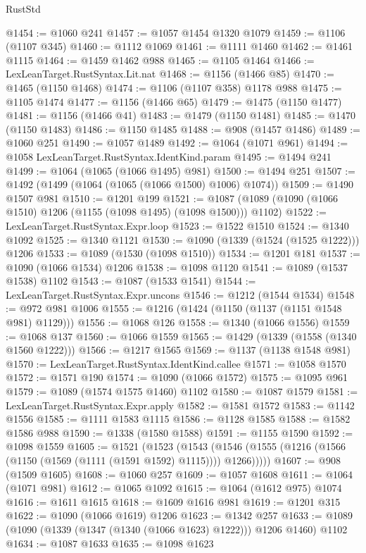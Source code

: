 \begin{lexlean}{RustStd}
\begin{coremodule}
@1454 := @1060 @241
@1457 := @1057 @1454 @1320 @1079
@1459 := @1106 (@1107 @345)
@1460 := @1112 @1069
@1461 := @1111 @1460
@1462 := @1461 @1115
@1464 := @1459 @1462 @988
@1465 := @1105 @1464
@1466 := LexLeanTarget.RustSyntax.Lit.nat
@1468 := @1156 (@1466 @85)
@1470 := @1465 (@1150 @1468)
@1474 := @1106 (@1107 @358) @1178 @988
@1475 := @1105 @1474
@1477 := @1156 (@1466 @65)
@1479 := @1475 (@1150 @1477)
@1481 := @1156 (@1466 @41)
@1483 := @1479 (@1150 @1481)
@1485 := @1470 (@1150 @1483)
@1486 := @1150 @1485
@1488 := @908 (@1457 @1486)
@1489 := @1060 @251
@1490 := @1057 @1489
@1492 := @1064 (@1071 @961)
@1494 := @1058 LexLeanTarget.RustSyntax.IdentKind.param
@1495 := @1494 @241
@1499 := @1064 (@1065 (@1066 @1495) @981)
@1500 := @1494 @251
@1507 := @1492 (@1499 (@1064 (@1065 (@1066 @1500) @1006) @1074))
@1509 := @1490 @1507 @981
@1510 := @1201 @199
@1521 := @1087 (@1089 (@1090 (@1066 @1510) @1206 (@1155 (@1098 @1495) (@1098 @1500))) @1102)
@1522 := LexLeanTarget.RustSyntax.Expr.loop
@1523 := @1522 @1510
@1524 := @1340 @1092
@1525 := @1340 @1121
@1530 := @1090 (@1339 (@1524 (@1525 @1222))) @1206
@1533 := @1089 (@1530 (@1098 @1510))
@1534 := @1201 @181
@1537 := @1090 (@1066 @1534) @1206
@1538 := @1098 @1120
@1541 := @1089 (@1537 @1538) @1102
@1543 := @1087 (@1533 @1541)
@1544 := LexLeanTarget.RustSyntax.Expr.uncons
@1546 := @1212 (@1544 @1534)
@1548 := @972 @981 @1006
@1555 := @1216 (@1424 (@1150 (@1137 (@1151 @1548 @981) @1129)))
@1556 := @1068 @126
@1558 := @1340 (@1066 @1556)
@1559 := @1068 @137
@1560 := @1066 @1559
@1565 := @1429 (@1339 (@1558 (@1340 @1560 @1222)))
@1566 := @1217 @1565
@1569 := @1137 (@1138 @1548 @981)
@1570 := LexLeanTarget.RustSyntax.IdentKind.callee
@1571 := @1058 @1570
@1572 := @1571 @190
@1574 := @1090 (@1066 @1572)
@1575 := @1095 @961
@1579 := @1089 (@1574 @1575 @1460) @1102
@1580 := @1087 @1579
@1581 := LexLeanTarget.RustSyntax.Expr.apply
@1582 := @1581 @1572
@1583 := @1142 @1556
@1585 := @1111 @1583 @1115
@1586 := @1128 @1585
@1588 := @1582 @1586 @988
@1590 := @1338 (@1580 @1588)
@1591 := @1155 @1590
@1592 := @1098 @1559
@1605 := @1521
    (@1523
      (@1543 (@1546 (@1555 (@1216 (@1566 (@1150 (@1569 (@1111 (@1591 @1592) @1115)))) @1266)))))
@1607 := @908 (@1509 @1605)
@1608 := @1060 @257
@1609 := @1057 @1608
@1611 := @1064 (@1071 @981)
@1612 := @1065 @1092
@1615 := @1064 (@1612 @975) @1074
@1616 := @1611 @1615
@1618 := @1609 @1616 @981
@1619 := @1201 @315
@1622 := @1090 (@1066 @1619) @1206
@1623 := @1342 @257
@1633 := @1089 (@1090 (@1339 (@1347 (@1340 (@1066 @1623) @1222))) @1206 @1460) @1102
@1634 := @1087 @1633
@1635 := @1098 @1623

\end{coremodule}
\end{lexlean}

